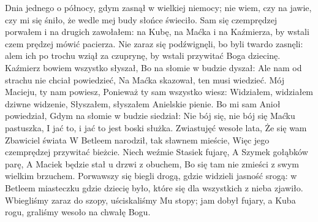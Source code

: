 \beginverse
Dnia jednego o północy,
gdym zasnął w wielkiej niemocy;
nie wiem, czy na jawie, czy mi się śniło,
że wedle mej budy słońce świeciło.
\endverse
\beginverse
Sam się czemprędzej porwałem
i na drugich zawołałem:
na Kubę, na Maćka i na Kaźmierza,
by wstali czem prędzej mówić pacierza.
\endverse
\beginverse
Nie zaraz się podźwignęli,
bo byli twardo zasnęli:
alem ich po trochu wziął za czuprynę,
by wstali przywitać Boga dziecinę.
\endverse
\beginverse
Kaźmierz bowiem wszystko słyszał,
Bo na słomie w budzie dyszał:
Ale nam od strachu nie chciał powiedzieć,
Na Maćka skazował, ten musi wiedzieć.
\endverse
\beginverse
Mój Macieju, ty nam powiesz,
Ponieważ ty sam wszystko wiesz:
Widziałem, widziałem dziwne widzenie,
Słyszałem, słyszałem Anielskie pienie.
\endverse
\beginverse
Bo mi sam Anioł powiedział,
Gdym na słomie w budzie siedział:
Nie bój się, nie bój się Maćku pastuszka,
I jać to, i jać to jest boski służka.
\endverse
\beginverse
Zwiastujęć wesołe lata,
Że się wam Zbawiciel świata
W Betleem narodził, tak sławnem mieście,
Więc jego czemprędzej przywitać bieżcie.
\endverse
\beginverse
Niech weźmie Stasiek fujarę,
A Szymek gołąbków parę,
A Maciek będzie stał u drzwi z obuchem,
Bo się tam nie zmieści z swym wielkim brzuchem.
\endverse
\beginverse
Porwawszy się biegli drogą,
gdzie widzieli jasność srogą:
w Betleem miasteczku gdzie dziecię było,
które się dla wszystkich z nieba zjawiło.
\endverse
\beginverse
Wbiegliśmy zaraz do szopy,
uściskaliśmy Mu stopy;
jam dobył fujary, a Kuba rogu,
graliśmy wesoło na chwałę Bogu.
\endverse
\endsong